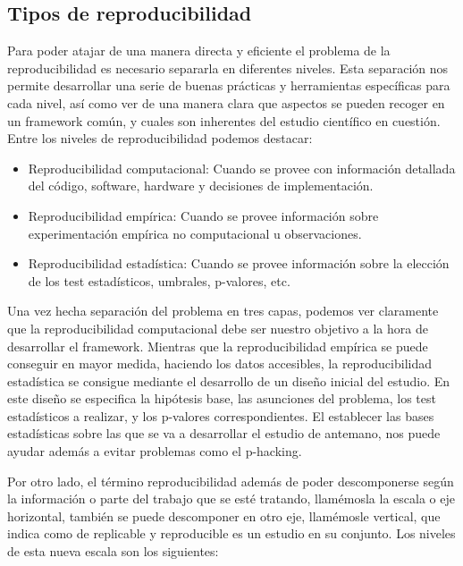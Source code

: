 \documentclass[
  12pt,
  a4paperpaper,
]{report}
\begin{document}
\hypertarget{tipos-de-reproducibilidad}{%
\subsection{Tipos de reproducibilidad}\label{tipos-de-reproducibilidad}}

Para poder atajar de una manera directa y eficiente el problema de la
reproducibilidad es necesario separarla en diferentes niveles. Esta
separación nos permite desarrollar una serie de buenas prácticas y
herramientas específicas para cada nivel, así como ver de una manera
clara que aspectos se pueden recoger en un framework común, y cuales son
inherentes del estudio científico en cuestión. Entre los niveles de
reproducibilidad podemos destacar:

\begin{itemize}
\item
  Reproducibilidad computacional: Cuando se provee con información
  detallada del código, software, hardware y decisiones de
  implementación.
\item
  Reproducibilidad empírica: Cuando se provee información sobre
  experimentación empírica no computacional u observaciones.
\item
  Reproducibilidad estadística: Cuando se provee información sobre la
  elección de los test estadísticos, umbrales, p-valores, etc.
\end{itemize}

Una vez hecha separación del problema en tres capas, podemos ver
claramente que la reproducibilidad computacional debe ser nuestro
objetivo a la hora de desarrollar el framework. Mientras que la
reproducibilidad empírica se puede conseguir en mayor medida, haciendo
los datos accesibles, la reproducibilidad estadística se consigue
mediante el desarrollo de un diseño inicial del estudio. En este diseño
se especifica la hipótesis base, las asunciones del problema, los test
estadísticos a realizar, y los p-valores correspondientes. El establecer
las bases estadísticas sobre las que se va a desarrollar el estudio de
antemano, nos puede ayudar además a evitar problemas como el p-hacking.

Por otro lado, el término reproducibilidad además de poder descomponerse
según la información o parte del trabajo que se esté tratando,
llamémosla la escala o eje horizontal, también se puede descomponer en
otro eje, llamémosle vertical, que indica como de replicable y
reproducible es un estudio en su conjunto. Los niveles de esta nueva
escala son los siguientes:
\end{document}
